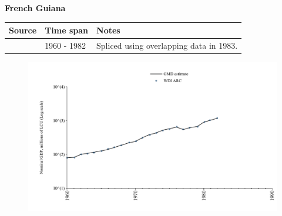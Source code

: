 \documentclass[12pt,a4paper,landscape]{article}
\begin{document}
\begin{adjustbox}{max totalsize={\paperwidth}{\paperheight},center}
\begin{minipage}[t][\textheight][t]{\textwidth}
\vspace*{0.5cm}
{}
\begin{center}
{\Large\bfseries French Guiana}
\end{center}
\vspace{0.5cm}
\begin{table}[H]
\centering
\small
\begin{tabular}{|l|l|l|}
\hline
\textbf{Source} & \textbf{Time span} & \textbf{Notes} \\
\hline
\rowcolor{white}\cite{WDI_ARC}& 1960 - 1982 &Spliced using overlapping data in 1983.\\
\hline
\end{tabular}
\end{table}
\begin{figure}[H]
\centering
\includegraphics[width=\textwidth,height=0.6\textheight,keepaspectratio]{graphs/GUF_nGDP.pdf}
\end{figure}
\end{minipage}
\end{adjustbox}
\end{document}
